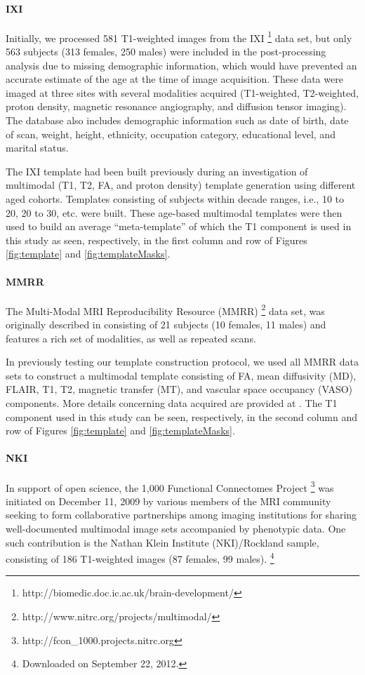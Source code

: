 \paragraph{IXI}
Initially, we processed 581 T1-weighted images from the IXI%
\footnote{
http://biomedic.doc.ic.ac.uk/brain-development/
}
 data set, but only 563 subjects
(313 females, 250 males) were included in the post-processing analysis due to 
missing demographic information, which would have prevented an accurate estimate of
the age at the time of image acquisition.  These data were
imaged at three sites 
with several modalities acquired (T1-weighted, T2-weighted, proton density, magnetic 
resonance angiography, and diffusion tensor imaging).  The 
database also includes demographic information such as date of birth, date
of scan, weight,
height, ethnicity, occupation category, educational level, and marital status.

The IXI template had been built previously during an investigation of  multimodal 
(T1, T2, FA, and proton density) template generation using different 
aged cohorts.  Templates consisting of subjects
within decade ranges, i.e., 10 to 20, 20 to 30, etc. were built.  These
age-based multimodal templates were then used to build an average ``meta-template'' of which 
the T1 component is used in this study as seen, respectively, in the first column and row of 
Figures \ref{fig:template} and \ref{fig:templateMasks}.

\paragraph{MMRR}
The Multi-Modal MRI Reproducibility Resource (MMRR)%
\footnote{
http://www.nitrc.org/projects/multimodal/
} 
data set, was originally described in \cite{landman2011} consisting of 
21 subjects (10 females, 11 males) and features a rich set of modalities, 
as well as repeated scans.

In previously testing our template construction protocol, we used all 
MMRR data sets to construct a multimodal template consisting of
FA, mean diffusivity (MD), FLAIR, T1, T2, magnetic transfer (MT), and 
vascular space occupancy (VASO) components.  More details concerning 
data acquired are provided at \cite{landman2011}.  The T1 component used in 
this study can be seen, respectively, in the second column and row of 
Figures \ref{fig:template} and \ref{fig:templateMasks}.

\paragraph{NKI}
In support of open science, the 1,000 Functional Connectomes Project%
\footnote{ 
http://fcon\_1000.projects.nitrc.org
}
was initiated on December 11, 2009 by various members of the MRI community
seeking to form collaborative partnerships among imaging institutions for
sharing well-documented multimodal image sets accompanied by phenotypic data.
One such contribution is the Nathan Klein Institute (NKI)/Rockland sample,
consisting of 186 T1-weighted
images (87 females, 99 males).%
\footnote{
Downloaded on September 22, 2012.
}

